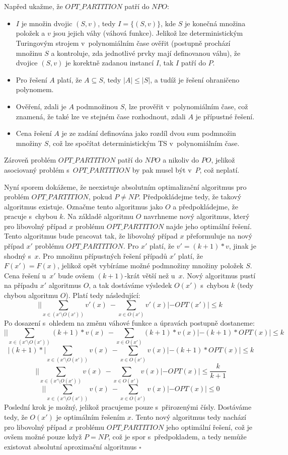 \documentclass[a4paper]{article}
\newcommand{\prt}{OPT\_PARTITION}
\begin{document}
\pagebreak

\section*{}
Napřed ukažme, že $\prt$ patří do $NPO$:
\begin{itemize}
 \item $I$ je množin dvojic $(S,v)$, tedy $I=\{(S,v)\}$, kde $S$ je konečná množina položek a $v$ jsou jejich váhy (váhová funkce).
  Jelikož lze deterministickým Turingovým strojem v~polynomiálním čase ověřit (postupně prochází množinu $S$ a kontroluje,
  zda jednotlivé prvky mají definovanou váhu), že dvojice $(S,v)$ je korektně zadanou instancí $I$, tak $I$ patří do $P$.
 \item Pro řešení $A$ platí, že $A\subseteq S$, tedy $|A|\leq |S|$, a tudíž je řešení ohraničeno polynomem.
 \item Ověření, zdali je $A$ podmnožinou $S$, lze prověřit v~polynomiálním čase, což znamená, že také lze ve stejném čase rozhodnout, zdali $A$ je přípustné řešení.
 \item Cena řešení $A$ je ze zadání definována jako rozdíl dvou sum podmnožin množiny $S$,
 což lze spočítat deterministickým TS v~polynomiálním čase.
\end{itemize}
 Zároveň problém $\prt$ patří do $NPO$ a nikoliv do $PO$, jelikož asociovaný problém s~$\prt$ by pak musel být v~$P$, což neplatí.

 Nyní sporem dokážeme, že neexistuje absolutním optimalizační algoritmus pro problém $\prt$, pokud $P \neq NP$.
 Předpokládejme tedy, že takový algoritmus existuje.
 Označme tento algoritmus jako $O$ a předpokládejme, že pracuje s~chybou $k$.
 Na základě algoritmu $O$ navrhneme nový algoritmus, který pro libovolný případ $x$ problému $\prt$ najde jeho optimální řešení.
 Tento algoritmus bude pracovat tak, že libovolný případ $x$ přeformuluje na nový případ $x'$ problému $\prt$.
 Pro $x'$ platí, že $v'=(k+1)*v$, jinak je shodný s~$x$.
 Pro množinu přípustných řešení případů $x'$ platí, že $F(x')=F(x)$, jelikož opět vybíráme možné podmnožiny množiny položek $S$.
 Cena řešení u~$x'$ bude ovšem $(k+1)$-krát větší než u~$x$.
 Nový algoritmus pustí na případu $x'$ algoritmus $O$, a tak dostáváme výsledek $O(x')$ s~chybou $k$ (tedy chybou algoritmu $O$).
 Platí tedy následující:
 $$ ||\sum_{x\in (x'\setminus O(x'))} v'(x)\ - \sum_{x\in O(x')} v'(x)| - OPT(x')| \leq k~$$
 Po dosazení s~ohledem na změnu váhové funkce a úpravách postupně dostaneme:
 $$ ||\sum_{x\in (x'\setminus O(x'))} (k+1)*v(x)\ - \sum_{x\in O(x')} (k+1)*v(x)| - (k+1)*OPT(x)| \leq k$$
 $$ |(k+1)*|\sum_{x\in (x'\setminus O(x'))} v(x)\ - \sum_{x\in O(x')} v(x)| - (k+1)*OPT(x)| \leq k$$
 $$ ||\sum_{x\in (x'\setminus O(x'))} v(x)\ - \sum_{x\in O(x')} v(x)| - OPT(x)| \leq \frac{k}{k+1}$$
 $$ ||\sum_{x\in (x'\setminus O(x'))} v(x)\ - \sum_{x\in O(x')} v(x)| - OPT(x)| \leq 0$$
 Poslední krok je možný, jelikož pracujeme pouze s~přirozenými čísly.
 Dostáváme tedy, že $O(x')$ je optimálním řešením $x$.
 Tento nový algoritmus tedy nachází pro libovolný případ $x$ problému $\prt$ jeho optimální řešení,
 což je ovšem možné pouze když $P=NP$, což je spor s~předpokladem,
 a tedy nemůže existovat absolutní aproximační algoritmus $\square$
\end{document}
